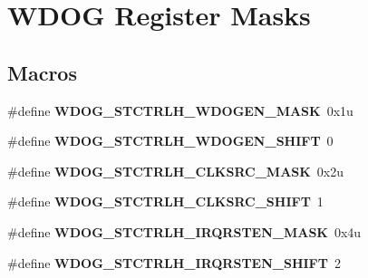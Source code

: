 \hypertarget{group___w_d_o_g___register___masks}{}\section{W\+D\+O\+G Register Masks}
\label{group___w_d_o_g___register___masks}
\subsection*{Macros}
\begin{DoxyCompactItemize}
\item 
\hypertarget{group___w_d_o_g___register___masks_ga4ca33884d6a6fed2670ba04150fbff3a}{}\#define {\bfseries W\+D\+O\+G\+\_\+\+S\+T\+C\+T\+R\+L\+H\+\_\+\+W\+D\+O\+G\+E\+N\+\_\+\+M\+A\+S\+K}~0x1u\label{group___w_d_o_g___register___masks_ga4ca33884d6a6fed2670ba04150fbff3a}

\item 
\hypertarget{group___w_d_o_g___register___masks_ga7d9c369fd8fe12905d3e4b2d94bfe9be}{}\#define {\bfseries W\+D\+O\+G\+\_\+\+S\+T\+C\+T\+R\+L\+H\+\_\+\+W\+D\+O\+G\+E\+N\+\_\+\+S\+H\+I\+F\+T}~0\label{group___w_d_o_g___register___masks_ga7d9c369fd8fe12905d3e4b2d94bfe9be}

\item 
\hypertarget{group___w_d_o_g___register___masks_gaf3ab71b185905c077887baa062ad6664}{}\#define {\bfseries W\+D\+O\+G\+\_\+\+S\+T\+C\+T\+R\+L\+H\+\_\+\+C\+L\+K\+S\+R\+C\+\_\+\+M\+A\+S\+K}~0x2u\label{group___w_d_o_g___register___masks_gaf3ab71b185905c077887baa062ad6664}

\item 
\hypertarget{group___w_d_o_g___register___masks_gaa437494e2c4bb2952986b89d4a52f2bf}{}\#define {\bfseries W\+D\+O\+G\+\_\+\+S\+T\+C\+T\+R\+L\+H\+\_\+\+C\+L\+K\+S\+R\+C\+\_\+\+S\+H\+I\+F\+T}~1\label{group___w_d_o_g___register___masks_gaa437494e2c4bb2952986b89d4a52f2bf}

\item 
\hypertarget{group___w_d_o_g___register___masks_ga64ebb40c66318cac7631c3fd467c846a}{}\#define {\bfseries W\+D\+O\+G\+\_\+\+S\+T\+C\+T\+R\+L\+H\+\_\+\+I\+R\+Q\+R\+S\+T\+E\+N\+\_\+\+M\+A\+S\+K}~0x4u\label{group___w_d_o_g___register___masks_ga64ebb40c66318cac7631c3fd467c846a}

\item 
\hypertarget{group___w_d_o_g___register___masks_ga0b519bf4ae17a11b51878819d4249e00}{}\#define {\bfseries W\+D\+O\+G\+\_\+\+S\+T\+C\+T\+R\+L\+H\+\_\+\+I\+R\+Q\+R\+S\+T\+E\+N\+\_\+\+S\+H\+I\+F\+T}~2\label{group___w_d_o_g___register___masks_ga0b519bf4ae17a11b51878819d4249e00}


\end{DoxyCompactItemize}
